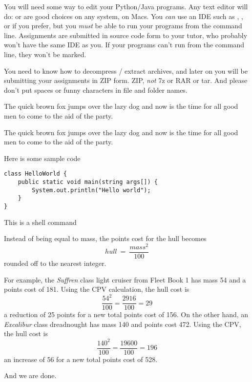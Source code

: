 You will need some way to edit your Python/Java programs. Any text editor will do:
 or  are good choices on any system,  on
Macs. You \emph{can} use an IDE such as , , or 
if you prefer, but you \emph{must} be able to run your programs from the command line.
Assignments are submitted in source code form to your tutor, who probably won't have
the same IDE as you. If your programs can't run from the command line, they won't be
marked.

You need to know how to decompress / extract  archives, and later on you will
be submitting your assignments in ZIP form. ZIP, \emph{not} 7z or RAR or tar.
And please don't put spaces or funny characters in file and folder names.



\DOT The quick brown fox jumps over the lazy dog and now is the time for all good men to come
to the aid of the party.


\begin{IMPORTANT}
The quick brown fox jumps over the lazy dog and now is the time for all good men to come
to the aid of the party.
\end{IMPORTANT}

Here is some sample code

\begin{CODE}\begin{verbatim}
class HelloWorld {
    public static void main(string args[]) {
        System.out.println("Hello world");
    }
}
\end{verbatim}\end{CODE}

This is a shell command



Instead of being equal to mass, the points cost for the hull becomes
\[ hull\ =\ \frac{mass^{2}} {100} \]
rounded off to the nearest integer.

For example, the \emph{Suffren} class light cruiser from Fleet Book 1
has mass 54 and a points cost of 181. Using the CPV calculation, the hull cost is
\[ \frac{54^{2}}{100} = \frac{2916}{100} = 29 \]
a reduction of 25 points for a new total points cost of 156. On the
other hand, an \emph{Excalibur} class dreadnought has mass 140 and points cost
472. Using the CPV, the hull cost is
\[ \frac{140^{2}}{100} = \frac{19600}{100} = 196 \]
an increase of 56 for a new total points
cost of 528.


And we are done.


